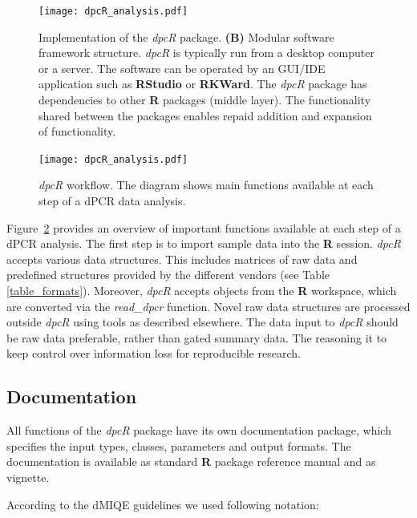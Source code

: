 \documentclass[a4,center,fleqn]{NAR}
\begin{document}
\begin{figure}[t]
\begin{center}
\texttt{[image: dpcR\_analysis.pdf]}
\end{center}
\caption{Implementation of the \textit{dpcR} package. \textbf{(B)} Modular software 
framework structure. \textit{dpcR} is typically run from a desktop computer or a 
server. The software can be operated by an GUI/IDE application such as 
\textbf{RStudio} or \textbf{RKWard}. The \textit{dpcR} package has dependencies 
to other \textbf{R} packages (middle layer). The functionality shared between 
the packages enables repaid addition and expansion of functionality.}
\label{dpcR_framework}
\end{figure}

\begin{figure}[t]
\begin{center}
\texttt{[image: dpcR\_analysis.pdf]}
\end{center}
\caption{\textit{dpcR} workflow. The diagram shows main functions 
available at each step of a dPCR data analysis.}
\label{workflow}
\end{figure}

Figure~\ref{workflow} provides an overview of important functions available at 
each step of a dPCR analysis. The first step is to import sample data into the 
\textbf{R} session. \textit{dpcR} accepts various data structures. This includes 
matrices of raw data and predefined structures provided by the different vendors 
(see Table \ref{table_formats}). Moreover, \textit{dpcR} accepts objects from 
the \textbf{R} workspace, which are converted via the \textit{read\_dpcr} 
function. Novel raw data structures are processed outside \textit{dpcR} using 
tools as described elsewhere. The data input to \textit{dpcR} should be raw data 
preferable, rather than gated summary data. The reasoning it to keep control 
over information loss for reproducible research.

\subsection{Documentation}

All functions of the \textit{dpcR} package have its own documentation package, 
which specifies the input types, classes, parameters and output formats. The 
documentation is available as standard \textbf{R} package reference manual and 
as vignette.

According to the dMIQE guidelines \cite{huggett_digital_2013} we used following notation:
\end{document}
